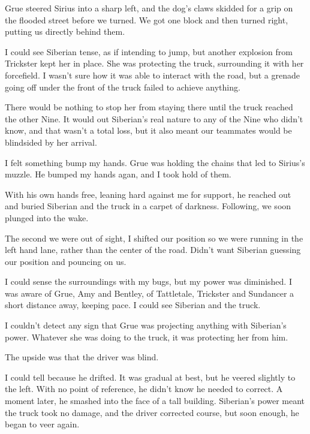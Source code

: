 Grue steered Sirius into a sharp left, and the dog's claws skidded for a grip on the flooded street before we turned.  We got one block and then turned right, putting us directly behind them.



I could see Siberian tense, as if intending to jump, but another explosion from Trickster kept her in place.  She was protecting the truck, surrounding it with her forcefield.  I wasn't sure how it was able to interact with the road, but a grenade going off under the front of the truck failed to achieve anything.



There would be nothing to stop her from staying there until the truck reached
the other Nine.  It would out Siberian's real nature to any of the Nine who didn't know, and that wasn't a total loss, but it also meant our teammates would be blindsided by her arrival.



I felt something bump my hands.  Grue was holding the chains that led to Sirius's muzzle.  He bumped my hands agan, and I took hold of them.



With his own hands free, leaning hard against me for support, he reached out and buried Siberian and the truck in a carpet of darkness.  Following, we soon plunged into the wake.



The second we were out of sight, I shifted our position so we were running in the left hand lane, rather than the center of the road.  Didn't want Siberian guessing our position and pouncing on us.



I could sense the surroundings with my bugs, but my power was diminished.  I was aware of Grue, Amy and Bentley, of Tattletale, Trickster and Sundancer a short distance away, keeping pace.  I could see Siberian and the truck.



I couldn't detect any sign that Grue was projecting anything with Siberian's power.  Whatever she was doing to the truck, it was protecting her from him.



The upside was that the driver was blind.



I could tell because he drifted.  It was gradual at best, but he veered slightly to the left.  With no point of reference, he didn't know he needed to correct.  A moment later, he smashed into the face of a tall building.  Siberian's power meant the truck took no damage, and the driver corrected course, but soon enough, he began to veer again.




